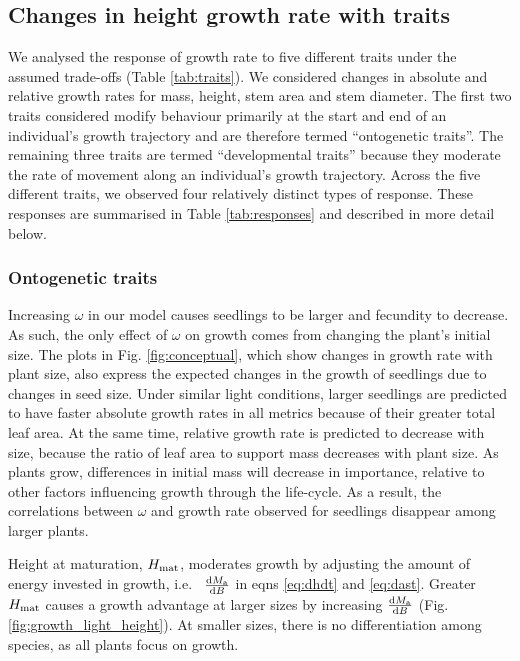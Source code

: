 \documentclass[9pt,twocolumn,twoside]{pnas-new}
\begin{document}
\subsection{Changes in height growth rate with traits}

We analysed the response of growth rate to five different traits under the assumed trade-offs (Table \ref{tab:traits}). We considered changes in absolute and relative growth rates for mass, height, stem area and stem diameter. The first two traits considered modify behaviour primarily at the start and end of an individual's growth trajectory and are therefore termed ``ontogenetic traits''. The remaining three traits are termed ``developmental traits'' because they moderate the rate of movement along an individual's growth trajectory. Across the five different traits, we observed four relatively distinct types of response. These responses are summarised in Table \ref{tab:responses} and described in more detail below.

\subsubsection{Ontogenetic traits}  Increasing $\omega$ in our model causes seedlings to be larger and fecundity to decrease. As such, the only effect of $\omega$ on growth comes from changing the plant's initial size. The plots in Fig. \ref{fig:conceptual}, which show changes in growth rate with plant size, also express the expected changes in the growth of seedlings due to changes in seed size. Under similar light conditions, larger seedlings are predicted to have faster absolute growth rates in all metrics because of their greater total leaf area. At the same time, relative growth rate is predicted to decrease with size, because the ratio of leaf area to support mass decreases with plant size. As plants grow, differences in initial mass will decrease in importance, relative to other factors influencing growth through the life-cycle. As a result, the correlations between $\omega$ and growth rate observed for seedlings disappear among larger plants.

Height at maturation, $H_{{\rm mat}}$, moderates growth by adjusting the amount of energy invested in growth, i.e.~ $\frac{{\rm d}M_{\rm a}}{{\rm d}B}$ in eqns \ref{eq:dhdt} and \ref{eq:dast}. Greater $H_{{\rm mat}}$ causes a growth advantage at larger sizes by increasing $\frac{{\rm d}M_{\rm a}}{{\rm d}B}$ (Fig. \ref{fig:growth_light_height}). At smaller sizes, there is no differentiation among species, as all plants focus on growth.
\end{document}
